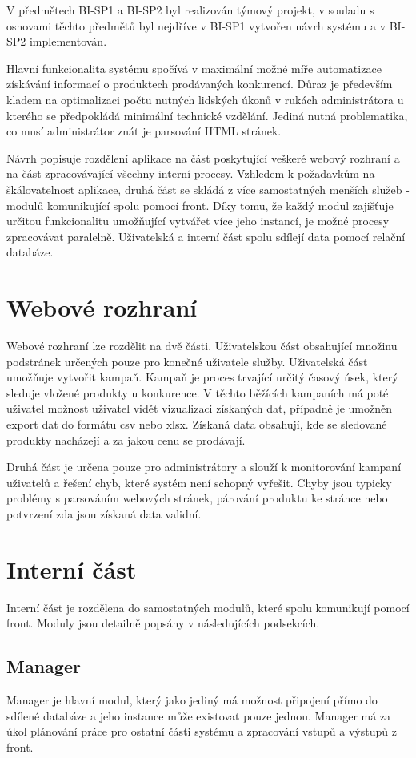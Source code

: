 \documentclass[thesis=B,czech]{FITthesis}[2012/06/26]
\begin{document}
V předmětech BI-SP1 a BI-SP2 byl realizován týmový projekt, v souladu s osnovami těchto předmětů byl nejdříve v BI-SP1 vytvořen návrh
systému a v BI-SP2 implementován.
\par
Hlavní funkcionalita systému spočívá v maximální možné míře automatizace získávání informací o produktech prodávaných konkurencí. Důraz je především kladem na optimalizaci počtu nutných lidských úkonů v rukách administrátora u kterého se předpokládá minimální technické vzdělání.
Jediná nutná problematika, co musí administrátor znát je parsování HTML stránek.
\par
Návrh popisuje rozdělení aplikace na část poskytující veškeré webový rozhraní a na část zpracovávající všechny interní procesy.
Vzhledem k požadavkům na škálovatelnost aplikace, druhá část se skládá z více samostatných menších služeb - modulů komunikující
spolu pomocí front. Díky tomu, že každý modul zajišťuje určitou funkcionalitu umožňující vytvářet více jeho instancí, je možné
procesy zpracovávat paralelně. 
Uživatelská a interní část spolu sdílejí data pomocí relační databáze\cite{DB}.
\par
\section{Webové rozhraní}
Webové rozhraní lze rozdělit na dvě části. Uživatelskou část obsahující množinu podstránek určených pouze pro konečné uživatele
služby. Uživatelská část umožňuje vytvořit kampaň. Kampaň je proces trvající určitý časový úsek, který sleduje vložené produkty u konkurence.
V těchto běžících kampaních má poté uživatel možnost uživatel vidět vizualizaci získaných dat, případně je umožněn export dat do formátu
csv nebo xlsx. Získaná data obsahují, kde se sledované produkty nacházejí a za jakou cenu se prodávají.
\par
Druhá část je určena pouze pro administrátory a slouží k monitorování kampaní uživatelů a řešení chyb, které systém není schopný vyřešit.
Chyby jsou typicky problémy s parsováním webových stránek, párování produktu ke stránce nebo potvrzení zda jsou získaná data validní.
\section{Interní část}
Interní část je rozdělena do samostatných modulů, které spolu komunikují pomocí front. Moduly jsou detailně popsány v následujících podsekcích.
\subsection{Manager}
Manager je hlavní modul, který jako jediný má možnost připojení přímo do sdílené databáze a jeho instance může existovat pouze jednou.
Manager má za úkol plánování práce pro ostatní části systému a zpracování vstupů a výstupů z front.
\end{document}
